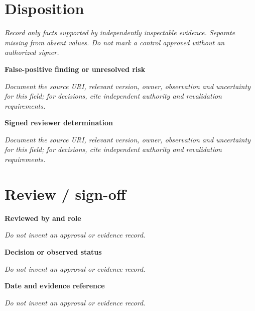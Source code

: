 \documentclass[11pt,letterpaper]{article}
\begin{document}
\section{Disposition}
\noindent\emph{Record only facts supported by independently inspectable evidence. Separate missing from absent values. Do not mark a control approved without an authorized signer.}\par
\noindent\textbf{False-positive finding or unresolved risk}\par
\noindent\emph{Document the source URI, relevant version, owner, observation and uncertainty for this field; for decisions, cite independent authority and revalidation requirements.}\par\medskip
\noindent\textbf{Signed reviewer determination}\par
\noindent\emph{Document the source URI, relevant version, owner, observation and uncertainty for this field; for decisions, cite independent authority and revalidation requirements.}\par\medskip
\section{Review / sign-off}
\noindent\textbf{Reviewed by and role}\par
\emph{Do not invent an approval or evidence record.}\par\medskip
\noindent\textbf{Decision or observed status}\par
\emph{Do not invent an approval or evidence record.}\par\medskip
\noindent\textbf{Date and evidence reference}\par
\emph{Do not invent an approval or evidence record.}\par\medskip
\end{document}
